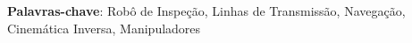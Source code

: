 \begin{thesisresumo}
	





\textbf{Palavras-chave}: Robô de Inspeção, Linhas de Transmissão, Navegação, Cinemática Inversa, Manipuladores

\end{thesisresumo}

